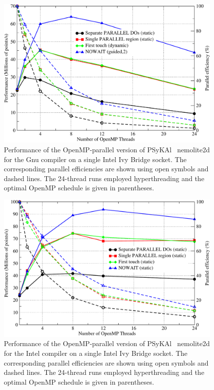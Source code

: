 \documentclass[journal]{IEEEtran}
\newlength{\picwidth}
\newcommand{\psykal}{{PS}y{KA}l\ }
\begin{document}
\begin{figure}
\centering
\includegraphics[width=\picwidth]{omp_scaling_32_gnu}
\caption{Performance of the OpenMP-parallel version of \psykal
  nemolite2d for the Gnu compiler on a single Intel Ivy Bridge
  socket. The corresponding parallel efficiencies are shown using open
  symbols and dashed lines. The 24-thread runs employed hyperthreading
  and the optimal OpenMP schedule is given in parentheses.}
\label{FIG_gnu_omp_32}
\end{figure}

\begin{figure}
\centering
\includegraphics[width=\picwidth]{omp_scaling_32_intel}
\caption{Performance of the OpenMP-parallel version of \psykal
  nemolite2d for the Intel compiler on a single Intel Ivy Bridge
  socket.  The corresponding parallel efficiencies are shown using
  open symbols and dashed lines. The 24-thread runs employed
  hyperthreading and the optimal OpenMP schedule is given in
  parentheses.}
\label{FIG_intel_omp_32}
\end{figure}
\end{document}
